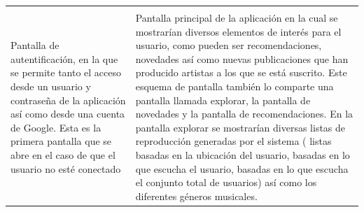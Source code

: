 \begin{tabular}{ p{6cm} p{6cm}}
\hline
\\
Pantalla de autentificación, en la que se permite tanto el acceso desde un usuario y contraseña de la aplicación así como desde una cuenta de Google. Esta es la primera pantalla que se abre en el caso de que el usuario no esté conectado
&
Pantalla principal de la aplicación en la cual se mostrarían diversos elementos de interés para el usuario, como pueden ser recomendaciones, novedades así como nuevas publicaciones que han producido artistas a los que se está suscrito.
Este esquema de pantalla también lo comparte una pantalla llamada explorar, la pantalla de novedades y la pantalla de recomendaciones.
En la pantalla explorar se mostrarían diversas listas de reproducción generadas por el sistema ( listas basadas en la ubicación del usuario, basadas en lo que escucha el usuario, basadas en lo que escucha el conjunto total de usuarios) así como los diferentes géneros musicales.  \\
\hline
\end{tabular}

